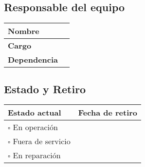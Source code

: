 \documentclass[a4paper, 10pt]{article}
\begin{document}
\subsection*{Responsable del equipo}
\noindent
\begin{tabularx}{\textwidth}{|l|X|}
    \hline
    \textbf{Nombre} & \\
    \hline
    \textbf{Cargo} & \\
    \hline
    \textbf{Dependencia} & \\
    \hline
\end{tabularx}
\subsection*{Estado y Retiro}
\noindent
\begin{tabularx}{\textwidth}{|p{}|X|}
    \hline
    \textbf{Estado actual} & \textbf{Fecha de retiro} \\
    \hline
    $\square$ En operación & \\
    \cline{1-1} %
    $\square$ Fuera de servicio & \\
    \cline{1-1}
    $\square$ En reparación & \\
    \hline
\end{tabularx}
\end{document}
